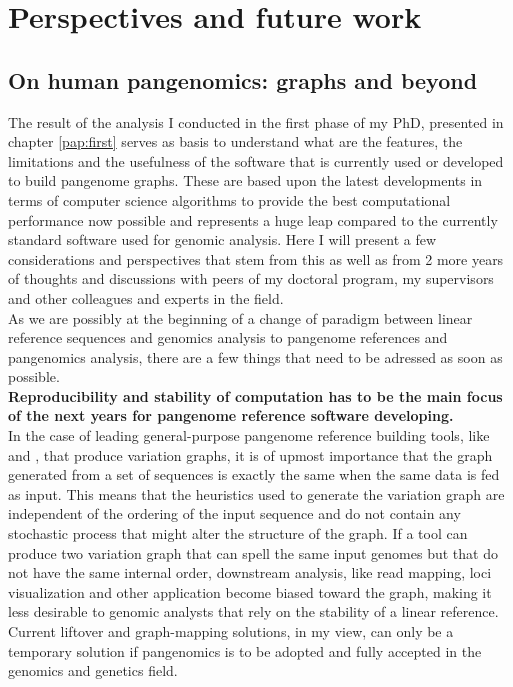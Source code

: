 
\chapter{Perspectives and future work}
\label{sec:perspectives}

\section{On human pangenomics: graphs and beyond}
The result of the analysis I conducted in the first phase of my PhD, presented in chapter \ref{pap:first} serves as basis to understand what are the features, the limitations and the usefulness of the software that is currently used or developed to build pangenome graphs. These are based upon the latest developments in terms of computer science algorithms to provide the best computational performance now possible and represents a huge leap compared to the currently standard software used for genomic analysis.
Here I will present a few considerations and perspectives that stem from this as well as from 2 more years of thoughts and discussions with peers of my doctoral program, my supervisors and other colleagues and experts in the field. \\
As we are possibly at the beginning of a change of paradigm between linear reference sequences and genomics analysis to pangenome references and pangenomics analysis, there are a few things that need to be adressed as soon as possible. \\
\textbf{Reproducibility and stability of computation has to be the main focus of the next years for pangenome reference software developing. \\}
In the case of leading general-purpose pangenome reference building tools, like \pggb and \mcactus, that produce variation graphs, it is of upmost importance that the graph generated from a set of sequences is exactly the same when the same data is fed as input. This means that the heuristics used to generate the variation graph are independent of the ordering of the input sequence and do not contain any stochastic process that might alter the structure of the graph. If a tool can produce two variation graph that can spell the same input genomes but that do not have the same internal order, downstream analysis, like read mapping, loci visualization and other application become biased toward the graph, making it less desirable to genomic analysts that rely on the stability of a linear reference. Current liftover and graph-mapping solutions, in my view, can only be a temporary solution if pangenomics is to be adopted and fully accepted in the genomics and genetics field. \\
